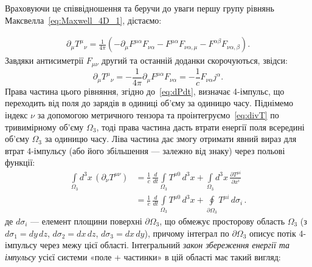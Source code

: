 Враховуючи це співвідношення та беручи до уваги першу групу рівнянь Максвелла~\eqref{eq:Maxwell_4D_1}, дістаємо:

\begin{align*}
    \partial_{\mu}T^{\mu}{}_{\nu}
    = \frac{1}{4\pi}\!\left(
    -\partial_{\mu}F^{\mu\alpha}F_{\nu\alpha}
    - F^{\mu\alpha}F_{\nu\alpha,\mu}
    - F^{\alpha\beta}F_{\nu\alpha,\beta}
    \right).
\end{align*}
Завдяки антисиметрії $F_{\mu\nu}$ другий та останній доданки скорочуються, звідси:
\begin{equation}\label{eq:divT}
    \partial_{\mu}T^{\mu}{}_{\nu}
    = -\frac{1}{4\pi}\partial_{\mu}F^{\mu\alpha}F_{\nu\alpha}
    = -\frac{1}{c}F_{\nu\alpha}j^{\alpha}.
\end{equation}
Права частина цього рівняння, згідно до~\eqref{eq:dPdt}, визначає 4-імпульс, що переходить від поля до зарядів в одиниці
об'єму за одиницю часу. Піднімемо індекс $\nu$ за допомогою метричного тензора та проінтегруємо~\eqref{eq:divT} по
тривимірному об'єму $\Omega_3$, тоді права частина дасть втрати енергії поля всередині об'єму $\Omega_3$ за одиницю
часу. Ліва частина дає змогу отримати явний вираз для втрат 4-імпульсу (або його збільшення --- залежно від знаку) через
польові функції:
\begin{align*}
    \int\limits_{\Omega_3} d^3 x \, (\partial_\nu T^{\mu\nu})
     & = \frac{1}{c}\,\frac{d}{dt} \int\limits_{\Omega_3} T^{\mu 0}\, d^3 x
    + \int\limits_{\Omega_3} d^3 x \, \frac{\partial T^{\mu i}}{\partial x^i} \\
     & = \frac{1}{c}\,\frac{d}{dt} \int\limits_{\Omega_3} T^{\mu 0}\, d^3 x
    + \oint\limits_{\partial \Omega_3} T^{\mu i}\, d\sigma_i \, .
\end{align*}
де $d\sigma_i$ --- елемент площини поверхні $\partial\Omega_3$, що обмежує просторову область $\Omega_3$ (з
$d\sigma_1=dy\,dz$, $d\sigma_2=dx\,dz$, $d\sigma_3=dx\,dy$), причому інтеграл по $\partial\Omega_3$ описує потік
4-імпульсу через межу цієї області. Інтегральний \emph{закон збереження енергії та імпульсу} усієї системи «поле + частинки» в цій області має такий вигляд:
